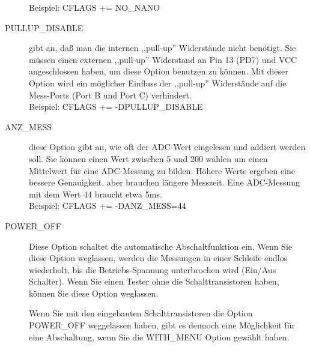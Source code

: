 \begin{description}
Beispiel: CFLAGS += NO\_NANO
  \item[PULLUP\_DISABLE] gibt an, daß man die internen ,,pull-up'' Widerstände nicht benötigt.
 Sie müssen einen externen ,,pull-up'' Widerstand an Pin 13 (PD7) und VCC angeschlossen haben, um diese
Option benutzen zu können.
Mit dieser Option wird ein möglicher Einfluss der ,,pull-up'' Widerstände auf die Mess-Ports (Port B und Port C) verhindert.\\
Beispiel: CFLAGS += -DPULLUP\_DISABLE
  \item[ANZ\_MESS] diese Option gibt an, wie oft der ADC-Wert eingelesen und addiert werden soll.
Sie können einen Wert zwischen 5 und 200 wählen um einen Mittelwert für eine ADC-Messung zu bilden.
Höhere Werte ergeben eine bessere Genauigkeit, aber brauchen längere Messzeit.
Eine ADC-Messung mit dem Wert 44 braucht etwa 5ms.\\
Beispiel: CFLAGS += -DANZ\_MESS=44
  \item[POWER\_OFF] Diese Option schaltet die automatische Abschaltfunktion ein.
Wenn Sie diese Option weglassen, werden die Messungen in einer Schleife endlos wiederholt, bis die Betriebs-Spannung 
unterbrochen wird (Ein/Aus Schalter).
Wenn Sie einen Tester ohne die Schalttransistoren haben, können Sie diese Option weglassen.

Wenn Sie mit den eingebauten Schalttransistoren die Option POWER\_OFF weggelassen haben,
gibt es dennoch eine Möglichkeit für eine Abschaltung, wenn Sie die WITH\_MENU Option gewählt haben.


\end{description}
